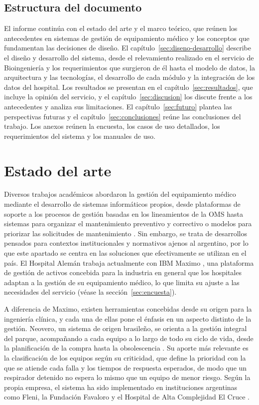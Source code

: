 \documentclass[10pt]{article}
\begin{document}
\subsection{Estructura del documento}
El informe continúa con el estado del arte y el marco teórico, que reúnen los antecedentes en sistemas de gestión de equipamiento médico y los conceptos que fundamentan las decisiones de diseño. El capítulo~\ref{sec:diseno-desarrollo} describe el diseño y desarrollo del sistema, desde el relevamiento realizado en el servicio de Bioingeniería y los requerimientos que surgieron de él hasta el modelo de datos, la arquitectura y las tecnologías, el desarrollo de cada módulo y la integración de los datos del hospital. Los resultados se presentan en el capítulo~\ref{sec:resultados}, que incluye la opinión del servicio, y el capítulo~\ref{sec:discusion} los discute frente a los antecedentes y analiza sus limitaciones. El capítulo~\ref{sec:futuro} plantea las perspectivas futuras y el capítulo~\ref{sec:conclusiones} reúne las conclusiones del trabajo. Los anexos reúnen la encuesta, los casos de uso detallados, los requerimientos del sistema y los manuales de uso.

\newpage
\section{Estado del arte}
\label{sec:estado-arte}
Diversos trabajos académicos abordaron la gestión del equipamiento médico mediante el desarrollo de sistemas informáticos propios, desde plataformas de soporte a los procesos de gestión basadas en los lineamientos de la OMS \cite{miranda_takayama2017} hasta sistemas para organizar el mantenimiento preventivo y correctivo \cite{khider_hamza2023} o modelos para priorizar las solicitudes de mantenimiento \cite{hamdi2012}. Sin embargo, se trata de desarrollos pensados para contextos institucionales y normativos ajenos al argentino, por lo que este apartado se centra en las soluciones que efectivamente se utilizan en el país. El Hospital Alemán trabaja actualmente con IBM Maximo \cite{ibm_maximo}, una plataforma de gestión de activos concebida para la industria en general que los hospitales adaptan a la gestión de su equipamiento médico, lo que limita su ajuste a las necesidades del servicio (véase la sección~\ref{sec:encuesta}).

A diferencia de Maximo, existen herramientas concebidas desde su origen para la ingeniería clínica, y cada una de ellas pone el énfasis en un aspecto distinto de la gestión. Neovero, un sistema de origen brasileño, se orienta a la gestión integral del parque, acompañando a cada equipo a lo largo de todo su ciclo de vida, desde la planificación de la compra hasta la obsolescencia \cite{neovero}. Su aporte más relevante es la clasificación de los equipos según su criticidad, que define la prioridad con la que se atiende cada falla y los tiempos de respuesta esperados, de modo que un respirador detenido no espera lo mismo que un equipo de menor riesgo. Según la propia empresa, el sistema ha sido implementado en instituciones argentinas como Fleni, la Fundación Favaloro y el Hospital de Alta Complejidad El Cruce \cite{neovero}.
\end{document}

